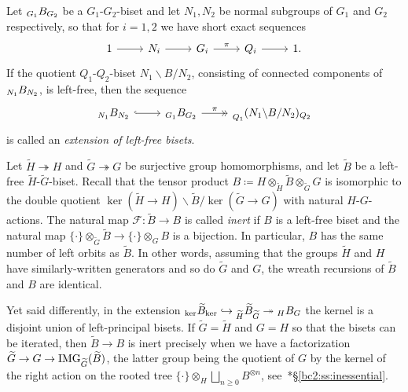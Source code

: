 \documentclass{amsart}
\newcommand\Forget{{\mathcal F}}
\newcommand\wtB{{\widetilde B}}
\newcommand\wtG{{\widetilde G}}
\newcommand\wtH{{\widetilde H}}
\begin{document}
\begin{defn}\label{defn:ses}
 Let $\subscript{G_1}B_{G_2}$ be a $G_1$-$G_2$-biset and let $N_1,N_2$ be
  normal subgroups of $G_1$ and $G_2$ respectively, so that for
  $i=1,2$ we have short exact sequences
  \begin{equation}\label{eq:ExtGr12}
    \begin{tikzcd}
      1\ar[r] & N_i\ar[r] & G_i\ar[r,"\pi"] & Q_i\ar[r] & 1.
    \end{tikzcd}
  \end{equation}
  If the quotient $Q_1$-$Q_2$-biset $N_1\backslash B/N_2$, consisting
  of connected components of $\subscript{N_1}B_{N_2}$, is left-free, then the
  sequence
  \begin{equation}\label{eq:BisetExt}
    \begin{tikzcd}
      \subscript{N_1}B_{N_2}\ar[r,hook] & \subscript{G_1}B_{G_2}\ar[r,->>,"\pi"] & \subscript{Q_1}(N_1\backslash B/N_2)_{Q_2}
    \end{tikzcd}
  \end{equation}
  is called an \emph{extension of left-free bisets}.
\end{defn}

\begin{defn}\label{defn:inert}
  Let $\wtH\twoheadrightarrow H$ and $\wtG\twoheadrightarrow G$ be
  surjective group homomorphisms, and let $\wtB$ be a left-free
  $\wtH$-$\wtG$-biset. Recall that the tensor product
  $B\coloneqq H\otimes_{\wtH}\wtB\otimes_{\wtG}G$ is isomorphic to the
  double quotient $\ker(\wtH\to H)\backslash \wtB/\ker(\wtG\to G)$
  with natural $H$-$G$-actions.  The natural map
  $\Forget\colon \wtB\to B$ is called \emph{inert} if $B$ is a
  left-free biset and the natural map
  $\{\cdot\}\otimes_\wtG \wtB \to\{\cdot\}\otimes_G B$ is a
  bijection. In particular, $B$ has the same number of left orbits as
  $\wtB$. In other words, assuming that the groups $\wtH$ and $H$ have
  similarly-written generators and so do $\wtG$ and $G$, the wreath
  recursions of $\wtB$ and $B$ are identical.

  Yet said differently, in the extension
  $\subscript{\ker}{\wtB}_{\ker}\hookrightarrow\subscript{\wtH}{\wtB}_{\wtG}\twoheadrightarrow\subscript H B_G$ the kernel is
  a disjoint union of left-principal bisets. If
  $\wtG=\wtH$ and $G=H$ so that the bisets can be
  iterated, then $\wtB\to B$ is inert precisely when we have a
  factorization
  $\wtG\to G\to\IMG_{\wtG}(\wtB)$, the latter
  group being the quotient of $G$ by the kernel of the
  right action on the rooted tree
  $\{\cdot\}\otimes_H\bigsqcup_{n\ge0}B^{\otimes n}$,
  see~\cite{bartholdi-dudko:bc2}*{\S\ref{bc2:ss:inessential}}.
\end{defn}
\end{document}
